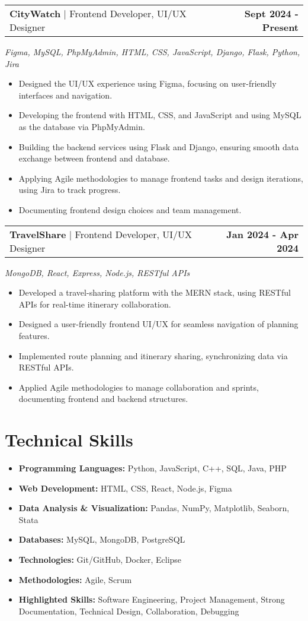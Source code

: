 \documentclass[letterpaper,11pt]{article}
\makeatletter
\newcommand{\resumeItem}[1]{
  \item\small{
    {#1 \vspace{-2pt}}
  }
}
\newcommand{\resumeProjectHeading}[2]{
    \item
    \begin{tabular*}{1.001\textwidth}{l@{\extracolsep{\fill}}r}
      \small#1 & \textbf{\small #2}\\
    \end{tabular*}\vspace{-8pt}
}
\newcommand{\resumeSubHeadingListStart}{\begin{itemize}[leftmargin=0.0in, label={}]}
\newcommand{\resumeSubHeadingListEnd}{\end{itemize}}
\newcommand{\resumeItemListStart}{\begin{itemize}}
\newcommand{\resumeItemListEnd}{\end{itemize}\vspace{-5pt}}
\makeatother
\begin{document}
\resumeProjectHeading
    {\textbf{CityWatch} $|$ Frontend Developer, UI/UX Designer }{Sept 2024 - Present}\vspace{-5pt}
    {\small \break\emph{Figma, MySQL, PhpMyAdmin, HTML, CSS, JavaScript, Django, Flask, Python, Jira}} \vspace{-5pt}
    \resumeItemListStart
        \resumeItem{Designed the UI/UX experience using Figma, focusing on user-friendly interfaces and navigation.}
        \resumeItem{Developing the frontend with HTML, CSS, and JavaScript and using MySQL as the database via PhpMyAdmin.}
        \resumeItem{Building the backend services using Flask and Django, ensuring smooth data exchange between frontend and database.}
        \resumeItem{Applying Agile methodologies to manage frontend tasks and design iterations, using Jira to track progress.}
        \resumeItem{Documenting frontend design choices and team management.}
    \resumeItemListEnd  
    \vspace{-10pt}

\resumeProjectHeading
    {\textbf{TravelShare} $|$ Frontend Developer, UI/UX Designer}{Jan 2024 - Apr 2024}\vspace{-5pt}
    {\small \break \emph{MongoDB, React, Express, Node.js, RESTful APIs}}\vspace{-5pt}
    \resumeItemListStart
    \resumeItem{Developed a travel-sharing platform with the MERN stack, using RESTful APIs for real-time itinerary collaboration.}
    \resumeItem{Designed a user-friendly frontend UI/UX for seamless navigation of planning features.}
    \resumeItem{Implemented route planning and itinerary sharing, synchronizing data via RESTful APIs.}
    \resumeItem{Applied Agile methodologies to manage collaboration and sprints, documenting frontend and backend structures.}
\resumeItemListEnd
    \vspace{-10pt}
\section{Technical Skills}
\footnotesize %
\resumeSubHeadingListStart
  \item{
    \textbf{Programming Languages:} Python, JavaScript, C++, SQL, Java, PHP
  }
  \item{
    \textbf{Web Development:} HTML, CSS, React, Node.js, Figma
  }
  \item{
    \textbf{Data Analysis \& Visualization:} Pandas, NumPy, Matplotlib, Seaborn, Stata
  }
  \item{
    \textbf{Databases:} MySQL, MongoDB, PostgreSQL
  }
  \item{
    \textbf{Technologies:} Git/GitHub, Docker, Eclipse
  }
  \item{
    \textbf{Methodologies:} Agile, Scrum
  }
  \item{
    \textbf{Highlighted Skills:} Software Engineering, Project Management, Strong Documentation, Technical Design, Collaboration, Debugging
  }
\resumeSubHeadingListEnd
\vspace{-16pt}
\end{document}
